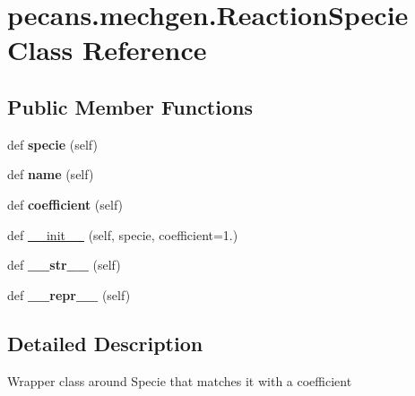 \hypertarget{classpecans_1_1mechgen_1_1ReactionSpecie}{}\section{pecans.\+mechgen.\+Reaction\+Specie Class Reference}
\label{classpecans_1_1mechgen_1_1ReactionSpecie}
\subsection*{Public Member Functions}
\begin{DoxyCompactItemize}
\item 
def {\bfseries specie} (self)\hypertarget{classpecans_1_1mechgen_1_1ReactionSpecie_ad46f5be87e846980da9dbed0bde770c0}{}\label{classpecans_1_1mechgen_1_1ReactionSpecie_ad46f5be87e846980da9dbed0bde770c0}

\item 
def {\bfseries name} (self)\hypertarget{classpecans_1_1mechgen_1_1ReactionSpecie_abfab8c1300934f4a9942b432f0183e2e}{}\label{classpecans_1_1mechgen_1_1ReactionSpecie_abfab8c1300934f4a9942b432f0183e2e}

\item 
def {\bfseries coefficient} (self)\hypertarget{classpecans_1_1mechgen_1_1ReactionSpecie_aa8abfaa343bd45881bcbe780386ad22f}{}\label{classpecans_1_1mechgen_1_1ReactionSpecie_aa8abfaa343bd45881bcbe780386ad22f}

\item 
def \hyperlink{classpecans_1_1mechgen_1_1ReactionSpecie_adcb988ca826c237283aa3974c5b09bd0}{\+\_\+\+\_\+init\+\_\+\+\_\+} (self, specie, coefficient=1.)
\item 
def {\bfseries \+\_\+\+\_\+str\+\_\+\+\_\+} (self)\hypertarget{classpecans_1_1mechgen_1_1ReactionSpecie_a05b56bc3073c951a5c79b8bcda39653e}{}\label{classpecans_1_1mechgen_1_1ReactionSpecie_a05b56bc3073c951a5c79b8bcda39653e}

\item 
def {\bfseries \+\_\+\+\_\+repr\+\_\+\+\_\+} (self)\hypertarget{classpecans_1_1mechgen_1_1ReactionSpecie_a011550a386862e687b892f33b8f1890f}{}\label{classpecans_1_1mechgen_1_1ReactionSpecie_a011550a386862e687b892f33b8f1890f}

\end{DoxyCompactItemize}


\subsection{Detailed Description}
\begin{DoxyVerb}Wrapper class around Specie that matches it with a coefficient
\end{DoxyVerb}
 

